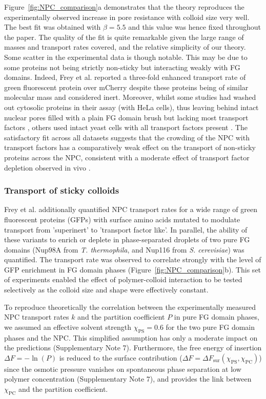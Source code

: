 \documentclass[12pt, a4paper]{article}
\begin{document}
Figure~\ref{fig:NPC_comparison}a demonstrates that the theory reproduces the experimentally observed increase in pore resistance with colloid size very well.
The best fit was obtained with $\beta = 5.5$ and this value was hence fixed  throughout the paper.
The quality of the fit is quite remarkable given the large range of masses and transport rates covered, and the relative simplicity of our theory.
Some scatter in the experimental data is though notable.
This may be due to some proteins not being strictly non-sticky but interacting weakly with FG domains.
Indeed, Frey et al. \cite{Frey2018} reported a three-fold enhanced transport rate of green fluorescent protein over mCherry despite these proteins being of similar molecular mass and considered inert.
Moreover, whilst some studies had washed out cytosolic proteins in their assay (with HeLa cells), thus leaving behind intact nuclear pores filled with a plain FG domain brush but lacking most transport factors \cite{Ribbeck2001, Mohr2009, Frey2018}, others used intact yeast cells with all transport factors present \cite{Popken2015, Timney2016}.
The satisfactory fit across all datasets suggests that the crowding of the NPC with transport factors has a comparatively weak effect on the transport of non-sticky proteins across the NPC, consistent with a moderate effect of transport factor depletion observed in vivo \cite{Kalita2022}.  


\subsubsection{Transport of sticky colloids}

Frey et al. \cite{Frey2018} additionally quantified NPC transport rates for a wide range of green fluorescent proteins (GFPs) with surface amino acids mutated to modulate transport from 'superinert' to 'transport factor like'.
In parallel, the ability of these variants to enrich or deplete in phase-separated droplets of two pure FG domains (Nup98A from \textit{T. thermophila}, and Nup116 from \textit{S. cerevisiae}) was quantified.
The transport rate was observed to correlate strongly with the level of GFP enrichment in FG domain phases (Figure~\ref{fig:NPC_comparison}b).
This set of experiments enabled the effect of polymer-colloid interaction to be tested selectively as the colloid size and shape were effectively constant.

To reproduce theoretically the correlation between the experimentally measured NPC transport rates $k$ and the partition coefficient $P$ in pure FG domain phases, we assumed an effective solvent strength $\chi_\text{PS} = 0.6$ for the two pure FG domain phases and the NPC. This simplified assumption has only a moderate impact on the predictions (Supplementary Note 7).
Furthermore, the free energy of insertion $\Delta F = -\ln(P)$ is reduced to the surface contribution ($\Delta F = \Delta F_\text{sur}\left(\chi_\text{PS},\chi_\text{PC}\right)$) since the osmotic pressure vanishes on spontaneous phase separation at low polymer concentration (Supplementary Note 7), and provides the link between $\chi_\text{PC}$ and the partition coefficient. 
\end{document}
